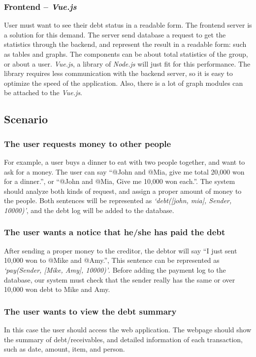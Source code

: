 \documentclass[11pt]{article}
\begin{document}
\subsubsection{Frontend -- \textit{Vue.js}}
User must want to see their debt status in a readable form.
The frontend server is a solution for this demand.
The server send database a request to get the statistics through the backend,
and represent the result in a readable form: such as tables and graphs.
The components can be about total statistics of the group, or about a user.
\textit{Vue.js}, a library of \textit{Node.js} will just fit for this performance.
The library requires less communication with the backend server,
so it is easy to optimize the speed of the application.
Also, there is a lot of graph modules can be attached to the \textit{Vue.js}.


\subsection{Scenario}
\subsubsection{The user requests money to other people}
For example, a user buys a dinner to eat with two people together,
and want to ask for a money.
The user can say ``@John and @Mia, give me total 20,000 won for a dinner.'',
or ``@John and @Mia, Give me 10,000 won each.''.
The system should analyze both kinds of request,
and assign a proper amount of money to the people.
Both sentences will be represented as \textit{`debt([john, mia], Sender, 10000)'},
and the debt log will be added to the database.

\subsubsection{The user wants a notice that he/she has paid the debt}
After sending a proper money to the creditor,
the debtor will say ``I just sent 10,000 won to @Mike and @Amy.'', 
This sentence can be represented as \textit{`pay(Sender, [Mike, Amy], 10000)'}.
Before adding the payment log to the database, our system must check that
the sender really has the same or over 10,000 won debt to Mike and Amy.

\subsubsection{The user wants to view the debt summary}
In this case the user should access the web application.
The webpage should show the summary of debt/receivables,
and detailed information of each transaction, such as date, amount, item, and person.
\end{document}
